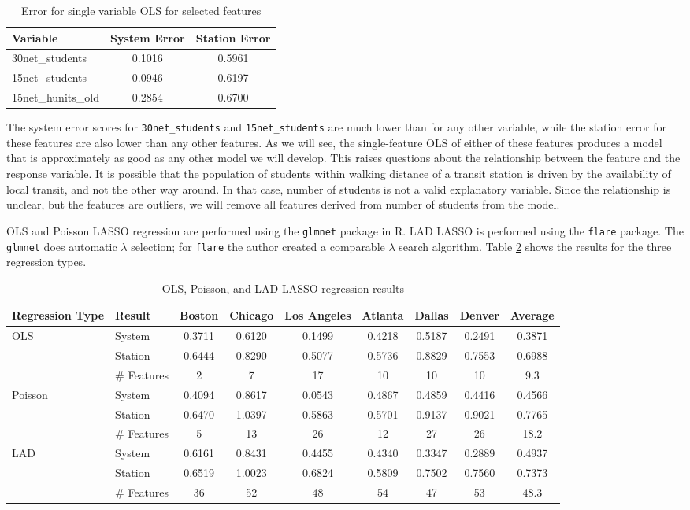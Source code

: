 \documentclass[11pt]{article}
\begin{document}
\begin{table}
\centering
\begin{tabular}{lcc}
\toprule Variable&System Error&Station Error\\
\midrule 30net\_students&0.1016&0.5961\\
15net\_students&0.0946&0.6197\\
15net\_hunits\_old&0.2854&0.6700\\ 
\bottomrule
\end{tabular}
\caption{Error for single variable OLS for selected features}\label{tab:students}
\end{table}

The system error scores for \texttt{30net\_students} and \texttt{15net\_students} are much lower than for any other variable, while the station error for these features are also lower than any other features. As we will see, the single-feature OLS of either of these features produces a model that is approximately as good as any other model we will develop. This raises questions about the relationship between the feature and the response variable. It is possible that the population of students within walking distance of a transit station is driven by the availability of local transit, and not the other way around. In that case, number of students is not a valid explanatory variable. Since the relationship is unclear, but the features are outliers, we will remove all features derived from number of students from the model.

OLS and Poisson LASSO regression are performed using the \texttt{glmnet} package in R. LAD LASSO is performed using the \texttt{flare} package. The \texttt{glmnet} does automatic $\lambda$ selection; for \texttt{flare} the author created a comparable $\lambda$ search algorithm. Table \ref{tab:lasso} shows the results for the three regression types. 


\begin{table}
\centering
\begingroup\fontsize{10}{15}\selectfont
\begin{tabular}{llccccccc}
\toprule
Regression Type&Result&Boston&Chicago&Los Angeles&Atlanta&Dallas&Denver&Average\\
\midrule
OLS&System&0.3711&0.6120&0.1499&0.4218&0.5187&0.2491&0.3871\\
&Station&0.6444&0.8290&0.5077&0.5736&0.8829&0.7553&0.6988\\
&\# Features&2&7&17&10&10&10&9.3\\
\midrule
Poisson&System&0.4094&0.8617&0.0543&0.4867&0.4859&0.4416&0.4566\\
&Station&0.6470&1.0397&0.5863&0.5701&0.9137&0.9021&0.7765\\
&\# Features&5&13&26&12&27&26&18.2\\
\midrule
LAD&System&0.6161&0.8431&0.4455&0.4340&0.3347&0.2889&0.4937\\
&Station&0.6519&1.0023&0.6824&0.5809&0.7502&0.7560&0.7373\\
&\# Features&36&52&48&54&47&53&48.3\\
\end{tabular}
\caption{OLS, Poisson, and LAD LASSO regression results}\label{tab:lasso}
\endgroup
\end{table}
\end{document}

